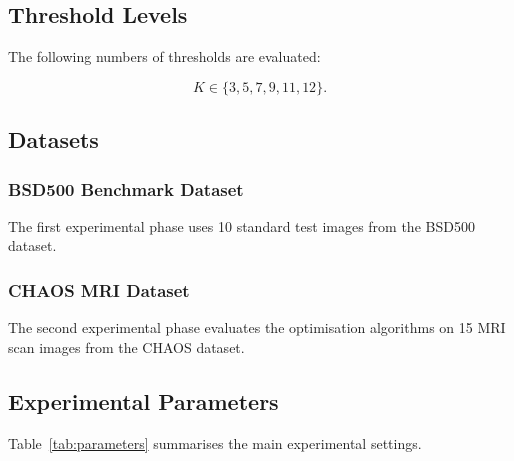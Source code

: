 \documentclass[review]{elsarticle}
\begin{document}


\subsection{Threshold Levels}

The following numbers of thresholds are evaluated:

\begin{equation}
K \in \{3,5,7,9,11,12\}.
\end{equation}


\subsection{Datasets}


\subsubsection{BSD500 Benchmark Dataset}

The first experimental phase uses 10 standard test images from the
BSD500 dataset.



\subsubsection{CHAOS MRI Dataset}

The second experimental phase evaluates the optimisation algorithms on
15 MRI scan images from the CHAOS dataset.



\subsection{Experimental Parameters}

Table~\ref{tab:parameters} summarises the main experimental settings.
\end{document}
